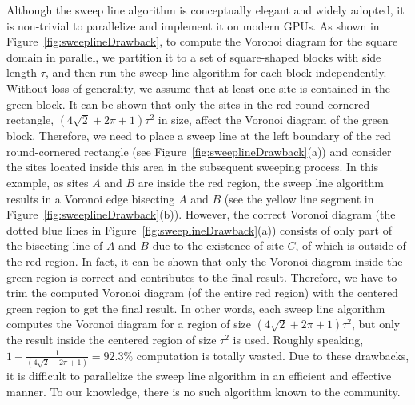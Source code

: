 Although the sweep line algorithm is conceptually elegant and widely
adopted, it is non-trivial to parallelize and implement it on modern
GPUs. As shown in Figure~\ref{fig:sweeplineDrawback}, to compute the
Voronoi diagram for the square domain in parallel, we partition it
to a set of square-shaped blocks with side length $\tau$, and then
run the sweep line algorithm for each block independently. Without
loss of generality, we assume that at least one site is contained in
the green block. It can be shown that only the sites in the red
round-cornered rectangle, $(4\sqrt{2}+2\pi+1)\tau^2$ in size, affect
the Voronoi diagram of the green block. Therefore, we need to place
a sweep line at the left boundary of the red round-cornered
rectangle (see Figure~\ref{fig:sweeplineDrawback}(a)) and consider
the sites located inside this area in the subsequent sweeping
process. In this example, as sites $A$ and $B$ are inside the red
region, the sweep line algorithm results in a Voronoi edge bisecting
$A$ and $B$ (see the yellow line segment in
Figure~\ref{fig:sweeplineDrawback}(b)). However, the correct Voronoi
diagram (the dotted blue lines in
Figure~\ref{fig:sweeplineDrawback}(a)) consists of only part of the
bisecting line of $A$ and $B$ due to the existence of site $C$,
of which is outside of the red region. In fact, it can be shown that
only the Voronoi diagram inside the green region is correct and
contributes to the final result. Therefore, we have to trim the
computed Voronoi diagram (of the entire red region) with the
centered green region to get the final result. In other words, each
sweep line algorithm computes the Voronoi diagram for a region of
size $(4\sqrt{2}+2\pi+1)\tau^2$, but only the result inside the
centered region of size $\tau^2$ is used. Roughly speaking,
$1-\frac{1}{(4\sqrt{2}+2\pi+1)}=92.3\%$ computation is totally
wasted. Due to these drawbacks, it is difficult to parallelize the
sweep line algorithm in an efficient and effective manner. To our
knowledge, there is no such algorithm known to the community.
